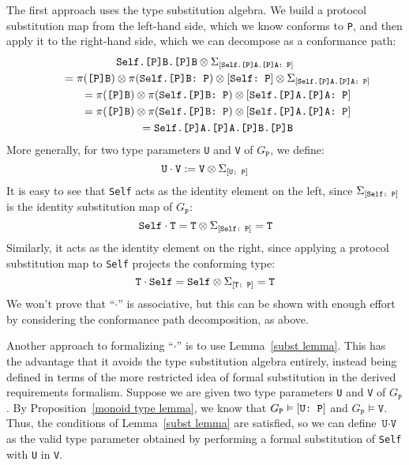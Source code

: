 \documentclass[../generics]{subfiles}
\begin{document}
The first approach uses the type substitution algebra. We build a protocol substitution map from the left-hand side, which we know conforms to \texttt{P}, and then apply it to the right-hand side, which we can decompose as a conformance path:
\begin{gather*}
\texttt{Self.[P]B.[P]B}\otimes\Sigma_{[\texttt{Self.[P]A.[P]A:~P}]}\\
\qquad {} = \pi(\texttt{[P]B}) \otimes \pi(\texttt{Self.[P]B:~P}) \otimes [\texttt{Self:~P}] \otimes \Sigma_{[\texttt{Self.[P]A.[P]A:~P}]}\\
\qquad {} = \pi(\texttt{[P]B}) \otimes \pi(\texttt{Self.[P]B:~P}) \otimes [\texttt{Self.[P]A.[P]A:~P}]\\
\qquad {} = \pi(\texttt{[P]B}) \otimes \pi(\texttt{Self.[P]B:~P}) \otimes [\texttt{Self.[P]A.[P]A:~P}]\\
\qquad {} = \texttt{Self.[P]A.[P]A.[P]B.[P]B}
\end{gather*}
More generally, for two type parameters \texttt{U} and \texttt{V} of $G_\texttt{P}$, we define:
\[\texttt{U}\cdot\texttt{V}:=\texttt{V}\otimes\Sigma_{[\texttt{U:~P}]}\]
It is easy to see that \texttt{Self} acts as the identity element on the left, since $\Sigma_{[\texttt{Self:~P}]}$ is the identity substitution map of $G_\texttt{P}$:
\[
\texttt{Self}\cdot\texttt{T} = \texttt{T}\otimes\Sigma_{[\texttt{Self:~P}]} = \texttt{T}
\]
Similarly, it acts as the identity element on the right, since applying a protocol substitution map to \texttt{Self} projects the conforming type:
\[
\texttt{T}\cdot\texttt{Self} = \texttt{Self}\otimes\Sigma_{[\texttt{T:~P}]} = \texttt{T}
\]
We won't prove that ``$\cdot$'' is associative, but this can be shown with enough effort by considering the conformance path decomposition, as above.

Another approach to formalizing ``$\cdot$'' is to use Lemma~\ref{subst lemma}. This has the advantage that it avoids the type substitution algebra entirely, instead being defined in terms of the more restricted idea of formal substitution in the derived requirements formalism. Suppose we are given two type parameters \texttt{U} and \texttt{V} of $G_\texttt{P}$. By Proposition~\ref{monoid type lemma}, we know that $G_\texttt{P}\vDash[\texttt{U:~P}]$ and $G_\texttt{P}\vDash\texttt{V}$. Thus, the conditions of Lemma~\ref{subst lemma} are satisfied, so we can define $\texttt{U}\cdot\texttt{V}$ as the valid type parameter obtained by performing a formal substitution of \texttt{Self} with \texttt{U} in \texttt{V}.
\end{document}
